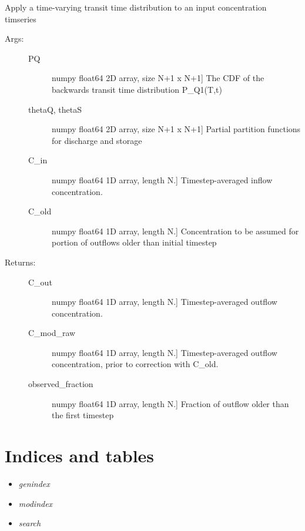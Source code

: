 \documentclass[letterpaper,10pt,english]{sphinxmanual}
\begin{document}
\begin{fulllineitems}
\label{index:rsas.transport_with_evapoconcentration}
Apply a time-varying transit time distribution to an input concentration timseries
\begin{description}
\item[{Args:}] \leavevmode\begin{description}
\item[{PQ}] \leavevmode{[}numpy float64 2D array, size N+1 x N+1{]}
The CDF of the backwards transit time distribution P\_Q1(T,t)

\item[{thetaQ, thetaS}] \leavevmode{[}numpy float64 2D array, size N+1 x N+1{]}
Partial partition functions for discharge and storage

\item[{C\_in}] \leavevmode{[}numpy float64 1D array, length N.{]}
Timestep-averaged inflow concentration.

\item[{C\_old}] \leavevmode{[}numpy float64 1D array, length N.{]}
Concentration to be assumed for portion of outflows older than initial
timestep

\end{description}

\item[{Returns:}] \leavevmode\begin{description}
\item[{C\_out}] \leavevmode{[}numpy float64 1D array, length N.{]}
Timestep-averaged outflow concentration.

\item[{C\_mod\_raw}] \leavevmode{[}numpy float64 1D array, length N.{]}
Timestep-averaged outflow concentration, prior to correction with C\_old.

\item[{observed\_fraction}] \leavevmode{[}numpy float64 1D array, length N.{]}
Fraction of outflow older than the first timestep

\end{description}

\end{description}

\end{fulllineitems}



\chapter{Indices and tables}
\label{index:indices-and-tables}\begin{itemize}
\item {} 
\emph{genindex}

\item {} 
\emph{modindex}

\item {} 
\emph{search}

\end{itemize}
\end{document}
